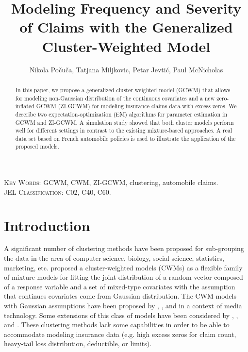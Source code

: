 \documentclass[11pt,letterpaper]{article}
\numberwithin{equation}{section}
\numberwithin{equation}{section}
\numberwithin{equation}{section}
\begin{document}
\title{\bf Modeling  Frequency and Severity of Claims with the Generalized  Cluster-Weighted Model}

\author{Nikola Po\v cu\v ca, Tatjana Miljkovic,  Petar Jevti\' c, Paul McNicholas  }%

\maketitle
\doublespacing
\small

\begin{abstract}

In this paper, we propose a generalized cluster-weighted model (GCWM) that allows for modeling non-Gaussian distribution of the continuous covariates and a new zero-inflated GCWM (ZI-GCWM) for modeling insurance claims data with excess zeros. We describe two expectation-optimization (EM) algorithms for parameter estimation in GCWM and ZI-GCWM. A simulation study showed that both cluster models perform well for different settings in contrast to the existing mixture-based approaches. A real data set based on French automobile policies is used to illustrate the application of the proposed models.

\end{abstract}
\textsc{Key Words:} GCWM, CWM, ZI-GCWM, clustering, automobile claims.\\
\textsc{JEL Classification:}  C02, C40, C60.\\
\section{Introduction}\label{sec:introduction}
A significant number of clustering methods have been proposed for sub-grouping the data in the area of computer science, biology, social science, statistics, marketing, etc. \cite{Ingrassia+Punzo+Vittadini+Minotti:2015} proposed a cluster-weighted models (CWMs) as a flexible family of mixture models for fitting the joint distribution of a random vector composed of a response variable and a set of mixed-type covariates with the assumption that continues covariates come from Gaussian distribution. The CWM models with Gaussian assumptions have been proposed by \cite{Gershenfeld:1997}, \cite{Gershenfeld:Schoner+Metois:1999}, and \cite{Gershenfeld:1999} in a context of media technology. Some extensions of this class of models have been considered by \cite{Punzo+Ingrassia:2015}, \cite{Ingrassia+Minotti+Punzo:2014}, and \cite{Ingrassia+Minotti+Vittadini:2012}. These clustering methods lack some capabilities in order to be able to accommodate modeling insurance data (e.g. high excess zeros for claim count, heavy-tail loss distribution, deductible, or limits).
\end{document}

